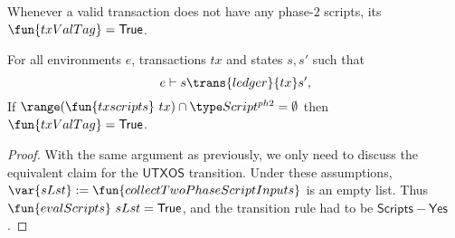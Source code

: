 \begin{property}
  \label{prop:is-valid}

Whenever a valid transaction does not have any phase-2 scripts, its
$\fun{txValTag} = \True$.

\begin{lemma}
  For all environments $e$, transactions $tx$ and states $s, s'$ such that
  \begin{equation*}
    e\vdash s\trans{ledger}{tx}s',
  \end{equation*}
  If $\range (\fun{txscripts}~tx) \cap \ScriptPhTwo = \emptyset$
  then $\fun{txValTag} = \True$.
\end{lemma}
\begin{proof}
  With the same argument as previously, we only need to discuss the
  equivalent claim for the $\mathsf{UTXOS}$ transition. Under these
  assumptions, $\var{sLst} := \fun{collectTwoPhaseScriptInputs}$ is an empty
  list. Thus $\fun{evalScripts}~sLst = \True$, and the transition rule
  had to be $\mathsf{Scripts{-}Yes}$.
\end{proof}
\end{property}

